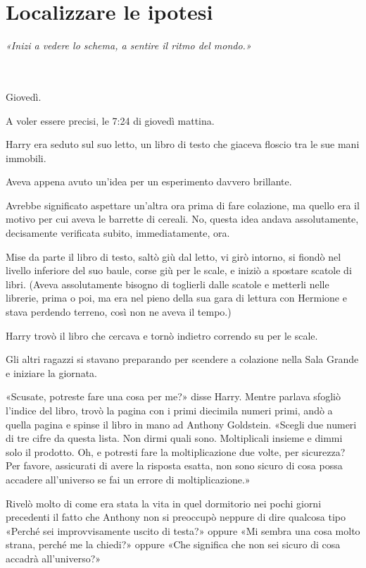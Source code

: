
\chapter{Localizzare le ipotesi}
\label{capitolo:17}

\emph{«Inizi a vedere lo schema, a sentire il ritmo del mondo.»}

~\\
~\\

Giovedì.

A voler essere precisi, le 7:24 di giovedì mattina.

Harry era seduto sul suo letto, un libro di testo che giaceva floscio tra le sue mani immobili.

Aveva appena avuto un’idea per un esperimento davvero brillante.

Avrebbe significato aspettare un’altra ora prima di fare colazione, ma quello era il motivo per cui aveva le barrette di cereali. No, questa idea andava assolutamente, decisamente verificata subito, immediatamente, ora.

Mise da parte il libro di testo, saltò giù dal letto, vi girò intorno, si fiondò nel livello inferiore del suo baule, corse giù per le scale, e iniziò a spostare scatole di libri. (Aveva assolutamente bisogno di toglierli dalle scatole e metterli nelle librerie, prima o poi, ma era nel pieno della sua gara di lettura con Hermione e stava perdendo terreno, così non ne aveva il tempo.)

Harry trovò il libro che cercava e tornò indietro correndo su per le scale.

Gli altri ragazzi si stavano preparando per scendere a colazione nella Sala Grande e iniziare la giornata.

«Scusate, potreste fare una cosa per me?» disse Harry. Mentre parlava sfogliò l’indice del libro, trovò la pagina con i primi diecimila numeri primi, andò a quella pagina e spinse il libro in mano ad Anthony Goldstein. «Scegli due numeri di tre cifre da questa lista. Non dirmi quali sono. Moltiplicali insieme e dimmi solo il prodotto. Oh, e potresti fare la moltiplicazione due volte, per sicurezza? Per favore, assicurati di avere la risposta esatta, non sono sicuro di cosa possa accadere all’universo se fai un errore di moltiplicazione.»

Rivelò molto di come era stata la vita in quel dormitorio nei pochi giorni precedenti il fatto che Anthony non si preoccupò neppure di dire qualcosa tipo «Perché sei improvvisamente uscito di testa?» oppure «Mi sembra una cosa molto strana, perché me la chiedi?» oppure «Che significa che non sei sicuro di cosa accadrà all’universo?»

